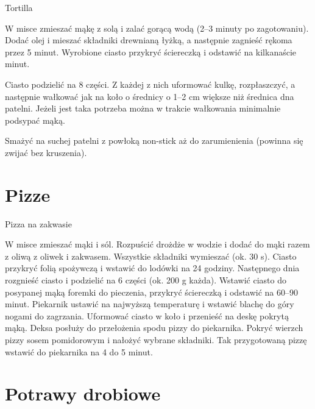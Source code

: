 \documentclass[a4paper,12pt]{article}
\begin{document}
\begin{recipe}{Tortilla}{}{}

W misce zmieszać mąkę z solą i zalać gorącą wodą (2--3 minuty po zagotowaniu).
Dodać olej i mieszać składniki drewnianą łyżką, a następnie zagnieść rękoma przez 5 minut.
Wyrobione ciasto przykryć ściereczką i odstawić na kilkanaście minut.

\freeform%
Ciasto podzielić na 8 części. Z każdej z nich uformować kulkę, rozpłaszczyć, a następnie wałkować jak na koło o średnicy o 1--2 cm większe niż średnica dna patelni. 
Jeżeli jest taka potrzeba można w trakcie wałkowania minimalnie podsypać mąką. 
 
Smażyć na suchej patelni z powłoką non-stick aż do zarumienienia (powinna się zwijać bez kruszenia).

\end{recipe}

\newpage
\section{Pizze}

\begin{recipe}{Pizza na zakwasie}{}{}

W misce zmieszać mąki i sól. Rozpuścić drożdże w wodzie i dodać do mąki
razem z oliwą z oliwek i zakwasem. Wszystkie składniki wymieszać (ok. 30 s).
Ciasto przykryć folią spożywczą i wstawić do lodówki na 24 godziny.
\freeform%
Następnego dnia rozgnieść ciasto i podzielić na 6 części (ok. 200 g każda).
Wstawić ciasto do posypanej mąką foremki do pieczenia, przykryć ściereczką i
odstawić na 60--90 minut. Piekarnik ustawić na najwyższą temperaturę i wstawić
blachę do góry nogami do zagrzania. Uformować ciasto w koło i przenieść na
deskę pokrytą mąką. Deksa posłuży do przełożenia spodu pizzy do
piekarnika. Pokryć wierzch pizzy sosem pomidorowym i nałożyć wybrane składniki.
Tak przygotowaną pizzę wstawić do piekarnika na 4 do 5 minut.

\end{recipe}

\newpage
\section{Potrawy drobiowe}
\end{document}
